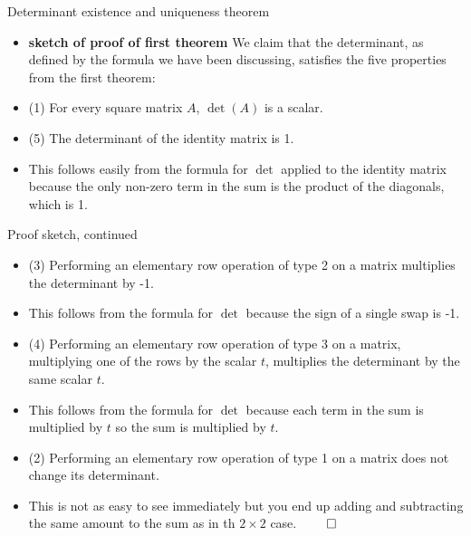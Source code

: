 \documentclass{beamer}
\begin{document}

\begin{frame}{Determinant existence and uniqueness theorem}

\begin{itemize}
\item \textbf{sketch of proof of first theorem} We claim that the determinant, as defined by the formula we have
been discussing, satisfies the five properties from the first theorem:
\item (1) For every square matrix $A$, $\det(A)$ is a scalar.
\item (5) The determinant of the identity matrix is 1.
\item This follows easily from the formula for $\det$ applied to the identity matrix because the only non-zero term in the
sum is the product of the diagonals, which is 1.
\end{itemize}
\end{frame}


\begin{frame}{Proof sketch, continued}

\begin{itemize}
\item (3) Performing an elementary row operation of type 2 on a matrix multiplies the determinant by -1.
\item This follows from the formula for $\det$ because the sign of a single swap is -1.
\item (4) Performing an elementary row operation of type 3 on a matrix, multiplying one of the rows by the scalar $t$,
multiplies the determinant by the same scalar $t$.
\item This follows from the formula for $\det$ because each term in the sum is multiplied by $t$ so the sum is multiplied by $t$.
\item (2) Performing an elementary row operation of type 1 on a matrix does not change its determinant.
\item This is not as easy to see immediately but you end up adding and subtracting the same amount to the sum as in
th $2\times 2$ case. $\qed$
\end{itemize}
\end{frame}

\end{document}
